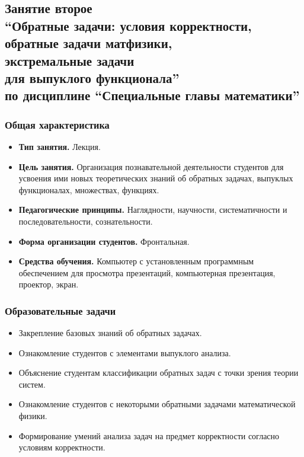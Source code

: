 \documentclass[compress, 9pt]{beamer}
\begin{document}
    \begin{refsection}
    \section[Занятие второе]{Занятие второе\\
        {\LARGE{\textbf{\enquote{Обратные задачи: условия корректности,\\ обратные задачи матфизики,\\ экстремальные задачи\\ для выпуклого функционала}}}}\\
        по дисциплине \enquote{Специальные главы математики}}

    \begin{frame}\frametitle{Общая характеристика}

        \begin{itemize}\justifying
            \item \textbf{Тип занятия.} Лекция.

            \item \textbf{Цель занятия.} Организация познавательной деятельности студентов для усвоения ими новых теоретических знаний об обратных задачах, выпуклых функционалах, множествах, функциях.

            \item \textbf{Педагогические принципы.} Наглядности, научности, систематичности и последовательности, сознательности.

            \item \textbf{Форма организации студентов.} Фронтальная.

            \item \textbf{Средства обучения.} Компьютер с установленным программным обеспечением для просмотра презентаций, компьютерная презентация, проектор, экран.
        \end{itemize}

    \end{frame}

    \begin{frame}\frametitle{Образовательные задачи}

        \begin{itemize}\justifying
            \item Закрепление базовых знаний об обратных задачах.
            \item Ознакомление студентов с элементами выпуклого анализа.
            \item Объяснение студентам классификации обратных задач с точки зрения теории систем.
            \item Ознакомление студентов с некоторыми обратными задачами математической физики.
            \item Формирование умений анализа задач на предмет корректности согласно условиям корректности.
        \end{itemize}


\end{frame}
\end{refsection}
\end{document}
